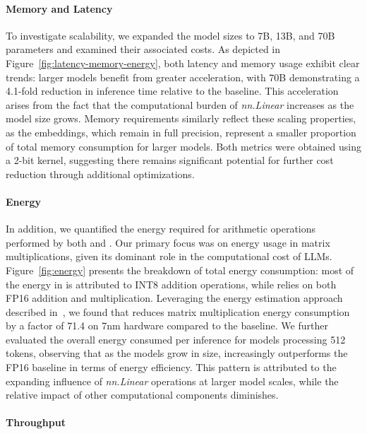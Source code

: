 \paragraph{Memory and Latency}

To investigate scalability, we expanded the model sizes to 7B, 13B, and 70B parameters and examined their associated costs. As depicted in Figure~\ref{fig:latency-memory-energy}, both latency and memory usage exhibit clear trends: larger models benefit from greater acceleration, with  70B demonstrating a 4.1-fold reduction in inference time relative to the  baseline. This acceleration arises from the fact that the computational burden of \emph{nn.Linear} increases as the model size grows. Memory requirements similarly reflect these scaling properties, as the embeddings, which remain in full precision, represent a smaller proportion of total memory consumption for larger models. Both metrics were obtained using a 2-bit kernel, suggesting there remains significant potential for further cost reduction through additional optimizations.

\paragraph{Energy}

In addition, we quantified the energy required for arithmetic operations performed by both  and . Our primary focus was on energy usage in matrix multiplications, given its dominant role in the computational cost of LLMs. Figure~\ref{fig:energy} presents the breakdown of total energy consumption: most of the energy in  is attributed to INT8 addition operations, while  relies on both FP16 addition and multiplication. Leveraging the energy estimation approach described in~\cite{energycost, pokebnn}, we found that  reduces matrix multiplication energy consumption by a factor of 71.4 on 7nm hardware compared to the baseline. We further evaluated the overall energy consumed per inference for models processing 512 tokens, observing that as the models grow in size,  increasingly outperforms the FP16  baseline in terms of energy efficiency. This pattern is attributed to the expanding influence of \emph{nn.Linear} operations at larger model scales, while the relative impact of other computational components diminishes.

\paragraph{Throughput}

